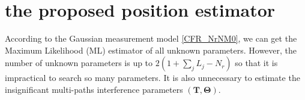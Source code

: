 \documentclass[journal]{IEEEtran}
\def \arg{\operatorname{arg}}
\begin{document}
\section{the proposed position estimator}
\label{sec:algorithm}
According to the Gaussian measurement model \eqref{CFR_NrNM0}, we can get the Maximum Likelihood (ML) estimator of all unknown parameters.
However, the number of unknown parameters is up to $2(1+\sum_jL_j-N_r)$ so that it is impractical to search so many parameters. It is also unnecessary to estimate the insignificant multi-paths interference parameters $(\mathbf{T},\boldsymbol{\Theta})$.
\end{document}
